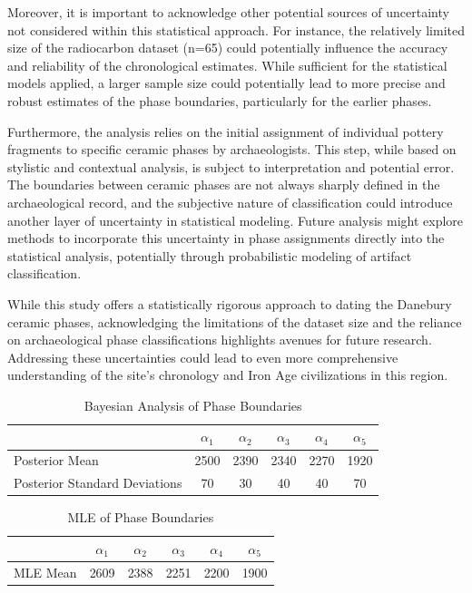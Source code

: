 \documentclass{article}
\begin{document}
Moreover, it is important to acknowledge other potential sources of uncertainty not considered within this statistical approach. For instance, the relatively limited size of the radiocarbon dataset (n=65) could potentially influence the accuracy and reliability of the chronological estimates. While sufficient for the statistical models applied, a larger sample size could potentially lead to more precise and robust estimates of the phase boundaries, particularly for the earlier phases.

Furthermore, the analysis relies on the initial assignment of individual pottery fragments to specific ceramic phases by archaeologists. This step, while based on stylistic and contextual analysis, is subject to interpretation and potential error. The boundaries between ceramic phases are not always sharply defined in the archaeological record, and the subjective nature of classification could introduce another layer of uncertainty in statistical modeling. Future analysis might explore methods to incorporate this uncertainty in phase assignments directly into the statistical analysis, potentially through probabilistic modeling of artifact classification.

While this study offers a statistically rigorous approach to dating the Danebury ceramic phases, acknowledging the limitations of the dataset size and the reliance on archaeological phase classifications highlights avenues for future research. Addressing these uncertainties could lead to even more comprehensive understanding of the site's chronology and Iron Age civilizations in this region.



\begin{table}[h!]
    \centering
    \caption{Bayesian Analysis of Phase Boundaries }
    \label{tab:posterior_means}
    \begin{tabular}{lccccc}
    & $\alpha_1$ & $\alpha_2$ & $\alpha_3$ & $\alpha_4$ & $\alpha_5$ \\
    \midrule
    Posterior Mean & 2500 & 2390 & 2340 & 2270 & 1920 \\
    Posterior Standard Deviations & 70 & 30 & 40 & 40 & 70 \\
    \end{tabular}
\end{table}

\begin{table}[h!]
    \centering
    \caption{MLE of Phase Boundaries}
    \label{tab:mle_means}
    \begin{tabular}{lccccc}
    & $\alpha_1$ & $\alpha_2$ & $\alpha_3$ & $\alpha_4$ & $\alpha_5$ \\
    \midrule
    MLE Mean & 2609 & 2388 & 2251 & 2200 & 1900 \\
    \end{tabular}
\end{table}
\end{document}
